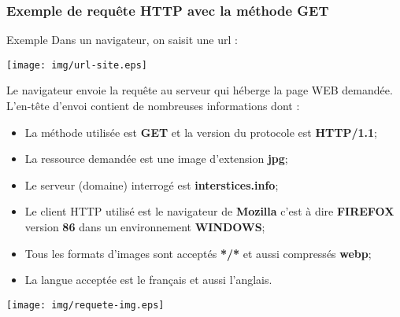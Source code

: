 \documentclass[8pt]{beamer}
\begin{document}
\begin{frame}
\frametitle{Exemple de requête HTTP avec la méthode GET}

\begin{exampleblock}{Exemple}
Dans un navigateur, on saisit une url :
\begin{center}
\texttt{[image: img/url-site.eps]}
\end{center}
Le navigateur envoie la requête au serveur qui héberge la page WEB demandée. L'en-tête d'envoi contient de nombreuses informations dont :
\begin{itemize}
\item La méthode utilisée est \textbf{GET} et la version du protocole est \textbf{HTTP/1.1};
\item La ressource demandée est une image d'extension \textbf{jpg};
\item Le serveur (domaine) interrogé est \textbf{interstices.info};
\item Le client HTTP utilisé est le navigateur de \textbf{Mozilla} c'est à dire \textbf{FIREFOX} version \textbf{86} dans un environnement \textbf{WINDOWS};
\item Tous les formats d'images sont acceptés \textbf{*/*} et aussi compressés \textbf{webp};
\item La langue acceptée est le français et aussi l'anglais.
\end{itemize}
\begin{center}
\texttt{[image: img/requete-img.eps]}
\end{center}

\end{exampleblock}

\end{frame}
\end{document}
